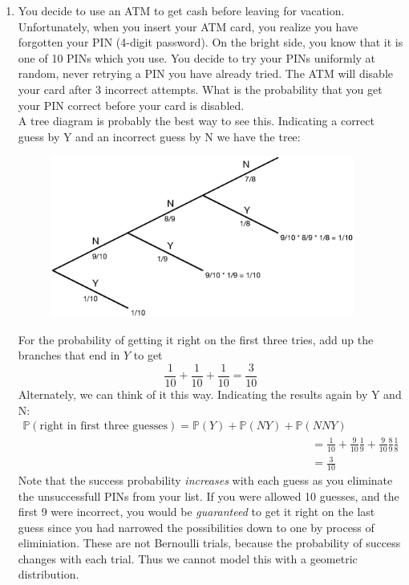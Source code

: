 \documentclass[12pt]{article}
\def\P{{\mathbb P}}
\begin{document}
\begin{enumerate}
\item You decide to use an ATM to get cash before leaving for vacation. Unfortunately, when you insert your ATM card, you realize you have forgotten your PIN (4-digit password). On the bright side, you know that it is one of 10 PINs which you use. You decide to try your PINs uniformly at random, never retrying a PIN you have already tried. The ATM will disable your card after 3 incorrect attempts. What is the probability that you get your PIN correct before your card is disabled.\\

A tree diagram is probably the best way to see this. Indicating a correct guess by Y and an incorrect guess by N we have the tree:
\begin{figure}[H]
\centering
\includegraphics[width=10cm]{passwordtree}
\end{figure}
For the probability of getting it right on the first three tries, add up the branches that end in $Y$ to get
\[
\frac{1}{10} + \frac{1}{10} + \frac{1}{10} = \frac{3}{10} 
\]
Alternately, we can think of it this way. Indicating the results again by Y and N:
\begin{align*}
\P(\text{right in first three guesses}) = \P(Y) + \P(NY) + \P(NNY) \\
&= \frac{1}{10} + \frac{9}{10}\frac{1}{9} + \frac{9}{10}\frac{8}{9}\frac{1}{8}\\
&= \frac{3}{10}
\end{align*}
Note that the success probability \emph{increases} with each guess as you eliminate the unsuccessfull PINs from your list. If you were allowed 10 guesses, and the first 9 were incorrect, you would be \emph{guaranteed} to get it right on the last guess since you had narrowed the possibilities down to one by process of eliminiation. These are not Bernoulli trials, because the probability of success changes with each trial. Thus we cannot model this with a geometric distribution.


\end{enumerate}
\end{document}
